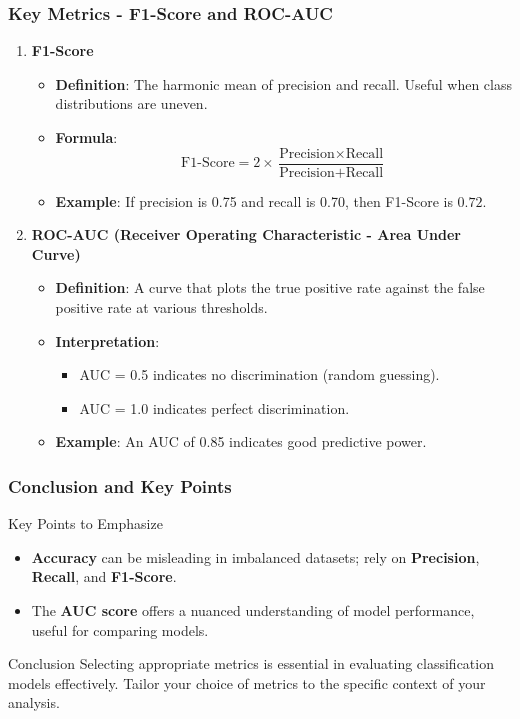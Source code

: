 \documentclass[aspectratio=169]{beamer}
\begin{document}
\begin{frame}[fragile]
    \frametitle{Key Metrics - F1-Score and ROC-AUC}
    
    \begin{enumerate}[resume]
        \item \textbf{F1-Score}
        \begin{itemize}
            \item \textbf{Definition}: The harmonic mean of precision and recall. Useful when class distributions are uneven.
            \item \textbf{Formula}: 
            \[
            \text{F1-Score} = 2 \times \frac{\text{Precision} \times \text{Recall}}{\text{Precision} + \text{Recall}}
            \]
            \item \textbf{Example}: If precision is 0.75 and recall is 0.70, then F1-Score is \( 0.72 \).
        \end{itemize}
        
        \item \textbf{ROC-AUC (Receiver Operating Characteristic - Area Under Curve)}
        \begin{itemize}
            \item \textbf{Definition}: A curve that plots the true positive rate against the false positive rate at various thresholds.
            \item \textbf{Interpretation}: 
            \begin{itemize}
                \item AUC = 0.5 indicates no discrimination (random guessing).
                \item AUC = 1.0 indicates perfect discrimination.
            \end{itemize}
            \item \textbf{Example}: An AUC of 0.85 indicates good predictive power.
        \end{itemize}
    \end{enumerate}
\end{frame}

\begin{frame}[fragile]
    \frametitle{Conclusion and Key Points}
    
    \begin{block}{Key Points to Emphasize}
        \begin{itemize}
            \item \textbf{Accuracy} can be misleading in imbalanced datasets; rely on \textbf{Precision}, \textbf{Recall}, and \textbf{F1-Score}.
            \item The \textbf{AUC score} offers a nuanced understanding of model performance, useful for comparing models.
        \end{itemize}
    \end{block}
    
    \begin{block}{Conclusion}
        Selecting appropriate metrics is essential in evaluating classification models effectively. Tailor your choice of metrics to the specific context of your analysis.
    \end{block}
\end{frame}
\end{document}
